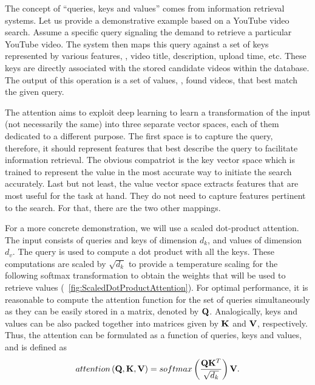 The concept of ``queries, keys and values'' comes from information retrieval systems. Let us provide a demonstrative example based on a YouTube video search. Assume a specific query signaling the demand to retrieve a particular YouTube video. The system then maps this query against a set of keys represented by various features, \egtext{}, video title, description, upload time, etc. These keys are directly associated with the stored candidate videos within the database. The output of this operation is a set of values, \ietext{}, found videos, that best match the given query.

The attention aims to exploit deep learning to learn a transformation of the input (not necessarily the same) into three separate vector spaces, each of them dedicated to a different purpose. The first space is to capture the query, therefore, it should represent features that best describe the query to facilitate information retrieval. The obvious compatriot is the key vector space which is trained to represent the value in the most accurate way to initiate the search accurately. Last but not least, the value vector space extracts features that are most useful for the task at hand. They do not need to capture features pertinent to the search. For that, there are the two other mappings.

For a more concrete demonstration, we will use a scaled dot-product attention. The input consists of queries and keys of dimension $d_k$, and values of dimension $d_v$. The query is used to compute a dot product with all the keys. These computations are scaled by $\sqrt{d_k}$ to provide a temperature scaling for the following softmax transformation to obtain the weights that will be used to retrieve values (\figtext{}~\ref{fig:ScaledDotProductAttention}). For optimal performance, it is reasonable to compute the attention function for the set of queries simultaneously as they can be easily stored in a matrix, denoted by $\mathbf{Q}$. Analogically, keys and values can be also packed together into matrices given by $\mathbf{K}$ and $\mathbf{V}$, respectively. Thus, the attention can be formulated as a function of queries, keys and values, and is defined as
\begin{equation}
    \label{eq:ScaledDotProductAttention}
    {attention} \left( \mathbf{Q}, \mathbf{K}, \mathbf{V} \right) =
    {softmax} \left( \frac{\mathbf{Q} \mathbf{K}^T}{\sqrt{d_k}} \right) \mathbf{V}.
\end{equation}

